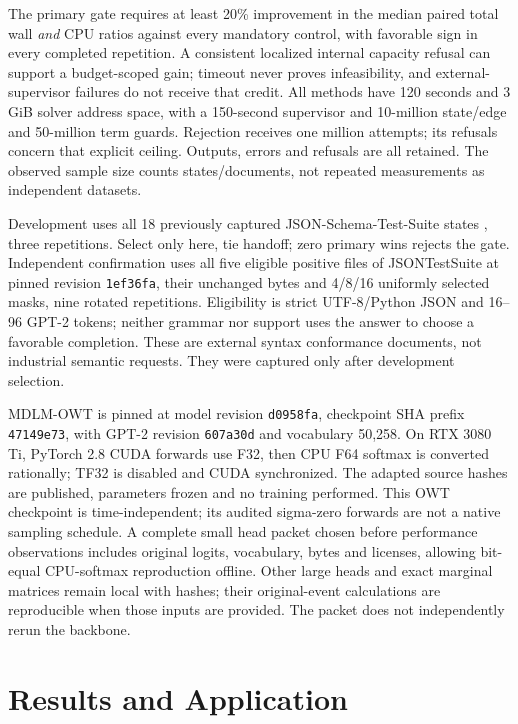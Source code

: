 \documentclass[12pt]{article}
\theoremstyle{readable}
\begin{document}
The primary gate requires at least 20\% improvement in the median paired total
wall \emph{and} CPU ratios against every mandatory control, with favorable
sign in every completed repetition. A consistent localized internal capacity
refusal can support a budget-scoped gain; timeout never proves infeasibility,
and external-supervisor failures do not receive that credit. All methods have
120 seconds and 3 GiB solver address space, with a 150-second supervisor and
10-million state/edge and 50-million term guards. Rejection receives one million
attempts; its refusals concern that explicit ceiling. Outputs, errors and
refusals are all retained. The observed sample size counts states/documents,
not repeated measurements as independent datasets.

Development uses all 18 previously captured JSON-Schema-Test-Suite states \cite{jsonschematestsuite},
three repetitions. Select only here, tie handoff; zero primary wins rejects
the gate. Independent confirmation uses all five eligible positive files of
JSONTestSuite \cite{nstjsontestsuite} at pinned revision \texttt{1ef36fa}, their unchanged bytes and
4/8/16 uniformly selected masks, nine rotated repetitions. Eligibility is
strict UTF-8/Python JSON and 16--96 GPT-2 tokens; neither grammar nor support
uses the answer to choose a favorable completion. These are external syntax
conformance documents, not industrial semantic requests. They were captured
only after development selection.

MDLM-OWT \cite{sahoo2024mdlm} is pinned at model revision \texttt{d0958fa},
checkpoint SHA prefix \texttt{47149e73}, with GPT-2 revision \texttt{607a30d}
and vocabulary 50,258. On RTX 3080 Ti, PyTorch 2.8 CUDA forwards use F32, then
CPU F64 softmax is converted rationally; TF32 is disabled and CUDA synchronized.
The adapted source hashes are published, parameters frozen and no training
performed. This OWT checkpoint is time-independent; its audited sigma-zero
forwards are not a native sampling schedule. A complete small head packet
chosen before performance observations includes original logits, vocabulary,
bytes and licenses, allowing bit-equal CPU-softmax reproduction offline.
Other large heads and exact marginal matrices remain local with hashes;
their original-event calculations are reproducible when those inputs are
provided. The packet does not independently rerun the backbone.

\section{Results and Application}

\end{document}
